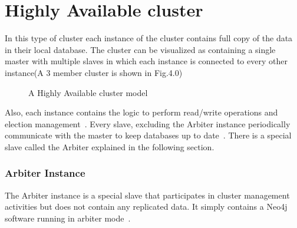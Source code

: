 \documentclass[9pt,twocolumn,twoside]{../../styles/osajnl}
\begin{document}
\section{Highly Available cluster}


In this type of cluster each instance of the cluster contains full copy of the data in their local database. The cluster can be visualized as containing a single master with multiple slaves in which each instance is connected to every other instance(A 3 member cluster is shown in Fig.4.0) 

\begin{figure}[htbp]
\centering
{}
\caption{A Highly Available cluster model~\cite{www-neo4j-ha}}
\label{fig:false-color}
\end{figure}

Also, each instance contains the logic to perform read/write operations and election management~\cite{www-neo4j-ha}. Every slave, excluding the Arbiter instance periodically communicate with the master to keep databases up to date~\cite{www-neo4j-ha}. There is a special slave called the Arbiter explained in the following section.
\subsubsection{Arbiter Instance}
The Arbiter instance is a special slave  that participates in cluster management activities but does not contain any replicated data. It simply contains a Neo4j software running in arbiter mode~\cite{www-neo4j-ha}. 
\end{document}
